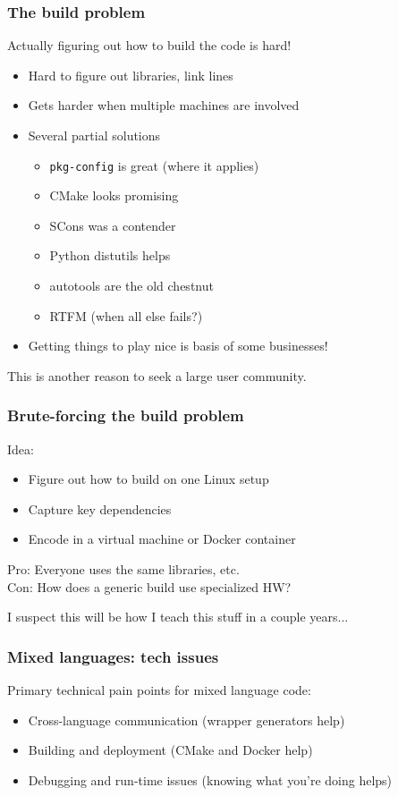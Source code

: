 \documentclass{beamer}
\begin{document}
\begin{frame}
  \frametitle{The build problem}

  Actually figuring out how to build the code is hard!
  \begin{itemize}
  \item Hard to figure out libraries, link lines
  \item Gets harder when multiple machines are involved
  \item Several partial solutions
    \begin{itemize}
    \item {\tt pkg-config} is great (where it applies)
    \item CMake looks promising
    \item SCons was a contender
    \item Python distutils helps
    \item autotools are the old chestnut
    \item RTFM (when all else fails?)
    \end{itemize}
  \item Getting things to play nice is basis of some businesses!
  \end{itemize}

  \vspace{5mm}
  This is another reason to seek a large user community.

\end{frame}


\begin{frame}
  \frametitle{Brute-forcing the build problem}

  Idea:
  \begin{itemize}
  \item Figure out how to build on one Linux setup
  \item Capture key dependencies
  \item Encode in a virtual machine or Docker container
  \end{itemize}
  Pro: Everyone uses the same libraries, etc. \\
  Con: How does a generic build use specialized HW?

  \vspace{5mm}
  I suspect this will be how I teach this stuff in a couple years...
\end{frame}


\begin{frame}
  \frametitle{Mixed languages: tech issues}

  Primary technical pain points for mixed language code:
  \begin{itemize}
  \item Cross-language communication (wrapper generators help)
  \item Building and deployment (CMake and Docker help)
  \item Debugging and run-time issues (knowing what you're doing
    helps)
  \end{itemize}
\end{frame}
\end{document}
